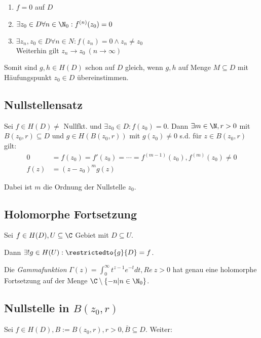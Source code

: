 \begin{enumerate}[label=(\alph*)]
	\item \(f = 0\) auf \(D\)
	\item \(\exists z_0 \in D \forall n \in \N_0 : f^{(n)}(z_0) = 0\)
	\item \(\exists z_n, z_0 \in D \forall n \in N : f(z_n) = 0 \land z_n \neq z_0\) \\ Weiterhin gilt \(z_n \to z_0 \ (n \to \infty)\)
\end{enumerate}

Somit sind \(g, h \in H(D)\) schon auf \(D\) gleich, wenn \(g, h\) auf Menge \(M \subseteq D\) mit Häufungspunkt \(z_0 \in D\) übereinstimmen.

\subsection*{Nullstellensatz}

Sei \(f \in H(D) \neq\) Nullfkt. und \(\exists z_0 \in D : f(z_0) = 0\). Dann \(\exists m \in \N, r > 0\) mit \(B(z_0, r) \subseteq D\) und \(g \in H(B(z_0,r))\) mit \(g(z_0) \neq 0\) s.d. für \(z \in B(z_0,r)\) gilt:
\begin{align*}
0 &= f(z_0) = f'(z_0) = \cdots = f^{(m-1)}(z_0), f^{(m)}(z_0) \neq 0 \\
f(z) &= (z-z_0)^m g(z)
\end{align*}

Dabei ist \(m\) die Ordnung der Nullstelle \(z_0\).

\subsection*{Holomorphe Fortsetzung}

Sei \(f \in H(D), U \subseteq \C\) Gebiet mit \(D \subseteq U\).

Dann \(\exists! g \in H(U) : \restrictedto{g}{D} = f\).

\spacing

Die \emph{Gammafunktion} \(\Gamma(z) = \int_0^\infty t^{z-1}e^{-t} dt, Re \ z > 0\) hat genau eine holomorphe Fortsetzung auf der Menge \(\C \setminus \{ -n | n \in \N_0 \}\).

\subsection*{Nullstelle in \(B(z_0,r)\)}

Sei \(f \in H(D), B := B(z_0,r), r > 0, \overline B \subseteq D\). Weiter:

